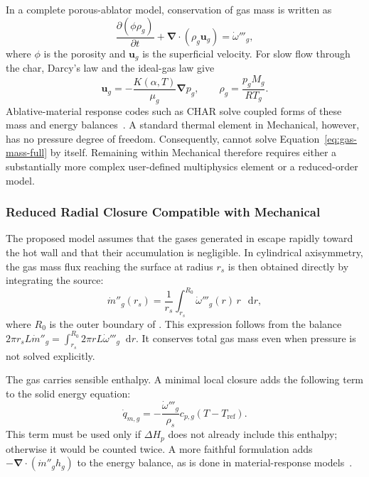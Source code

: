 \documentclass[oneside,openany]{amsdtx}
\newcommand{\dd}{\mathop{}\!\mathrm{d}}
\newcommand{\pd}{\partial}
\newcommand{\vect}[1]{\bm{#1}}
\begin{document}
In a complete porous-ablator model, conservation of gas mass is written as
\begin{equation}
  \frac{\pd(\phi\rho_g)}{\pd t}
  +\vect\nabla\cdot(\rho_g\vect u_g)=\dot\omega'''_g,
  \label{eq:gas-mass-full}
\end{equation}
where \(\phi\) is the porosity and \(\vect u_g\) is the superficial velocity.
For slow flow through the char, Darcy's law and the ideal-gas law give
\begin{equation}
  \vect u_g=-\frac{K(\alpha,T)}{\mu_g}\vect\nabla p_g,
  \qquad
  \rho_g=\frac{p_g M_g}{R T_g}.
  \label{eq:darcy-ideal}
\end{equation}
Ablative-material response codes such as CHAR solve coupled forms of these mass
and energy balances~\cite{amar2010,amar2016,ewing2013}. A standard thermal
element in Mechanical, however, has no pressure degree of freedom. Consequently,
 cannot solve Equation~\eqref{eq:gas-mass-full} by itself.
Remaining within Mechanical therefore requires either a substantially more
complex user-defined multiphysics element or a reduced-order model.

\subsubsection{Reduced Radial Closure Compatible with Mechanical}

The proposed model assumes that the gases generated in  escape
rapidly toward the hot wall and that their accumulation is negligible. In
cylindrical axisymmetry, the gas mass flux reaching the surface at radius
\(r_s\) is then obtained directly by integrating the source:
\begin{equation}
  \boxed{\dot m''_g(r_s)=\frac{1}{r_s}
  \int_{r_s}^{R_0}\dot\omega'''_g(r)\,r\,\dd r,}
  \label{eq:radial-gas-flux}
\end{equation}
where \(R_0\) is the outer boundary of . This expression follows
from the balance \(2\pi r_sL\dot m''_g=\int_{r_s}^{R_0}2\pi rL
\dot\omega'''_g\dd r\). It conserves total gas mass even when pressure is not
solved explicitly.

The gas carries sensible enthalpy. A minimal local closure adds the following
term to the solid energy equation:
\begin{equation}
  \dot q_{m,g}=-\frac{\dot\omega'''_g}{\rho_s}
  c_{p,g}(T-T_\mathrm{ref}).
  \label{eq:gas-local-sink}
\end{equation}
This term must be used only if \(\Delta H_p\) does not already include this
enthalpy; otherwise it would be counted twice. A more faithful formulation adds
\(-\vect\nabla\cdot(\dot m''_g h_g)\) to the energy balance, as is done in
material-response models~\cite{ewing2013,amar2010}.
\end{document}
